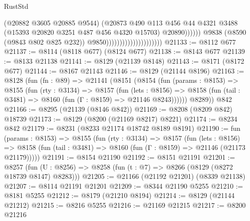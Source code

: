 \begin{lexlean}{RustStd}
\begin{coremodule}
                                                        (@20882 @3605 @20885 @9544)
                                                        (@20873
                                                          @490
                                                          @113
                                                          @456
                                                          @44
                                                          @4321
                                                          @3488
                                                          (@15393
                                                            @20820
                                                            @3251
                                                            @487
                                                            @456
                                                            @4320
                                                            @15703)
                                                          @20890))))))
                                              @9838
                                              (@8590 (@9843 @802 @825 @232))
                                              @9850)))))))))))))))))))))
@21133 := @8112 @677
@21137 := @8114 (@8118 @677) (@8124 @677)
@21138 := @8143 @677
@21139 := @8133 @21138
@21141 := @8129 (@21139 @8148)
@21143 := @8171 (@8172 @677)
@21144 := @8167 @21143
@21146 := @8129 (@21144 @8196)
@21163 := @8128
    (fun (fn : @89) =>
    @21141
      (@8151
        (@8154
          (fun (params : @8153) =>
          @8155
            (fun (rty : @3134) =>
            @8157
              (fun (lets : @8156) =>
              @8158 (fun (tail : @3481) => @8160 (fun (Γ : @8159) => @21146 @8243))))))
        @8289))
    @842
@21166 := @8295 (@21139 (@8146 @842))
@21169 := @8208 (@8209 @842) @18739
@21173 := @8129 (@8200 (@21169 @8217) @8221)
@21174 := @8234 @842
@21179 := @8231 (@8233 @21174 @18742 @8189 @8191)
@21190 := fun (params : @8153) =>
  @8155
    (fun (rty : @3134) =>
    @8157
      (fun (lets : @8156) =>
      @8158 (fun (tail : @3481) => @8160 (fun (Γ : @8159) => @21146 (@21173 @21179)))))
@21191 := @8154 @21190
@21192 := @8151 @21191
@21201 := @8257
    (fun (U : @8256) => @8258 (fun (t : @7) => @8266 (@8129 (@8272 @18739 @8147) @8283)))
@21205 := @21166 (@21192 @21201) (@8339 @21138)
@21207 := @8114 @21191 @21201
@21209 := @8344 @21190 @5255
@21210 := @8181 @5255
@21212 := @8179 (@21210 @8194)
@21214 := @8129 (@21144 @21212)
@21215 := @8216 @5255
@21216 := @21169 @21215
@21217 := @8200 @21216

\end{coremodule}
\end{lexlean}
